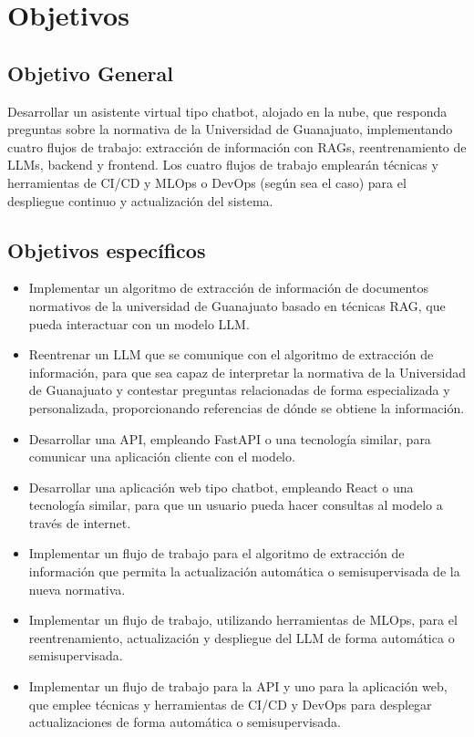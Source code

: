 \section{Objetivos}

\subsection{Objetivo General}

Desarrollar un asistente virtual tipo chatbot, alojado en la nube, que responda
preguntas sobre la normativa de la Universidad de Guanajuato, implementando cuatro
flujos de trabajo: extracción de información con RAGs, reentrenamiento de LLMs,
backend y frontend. Los cuatro flujos de trabajo emplearán técnicas y herramientas
de CI/CD y MLOps o DevOps (según sea el caso) para el despliegue continuo y
actualización del sistema.

\subsection{Objetivos específicos}

\begin{itemize}
      \item Implementar un algoritmo de extracción de información de documentos
            normativos de la universidad de Guanajuato basado en técnicas RAG, que
            pueda interactuar con un modelo LLM.
      \item Reentrenar un LLM que se comunique con el algoritmo de extracción de
            información, para que sea capaz de interpretar la normativa de la Universidad
            de Guanajuato y contestar preguntas relacionadas de forma especializada y
            personalizada, proporcionando referencias de dónde se obtiene la información.
      \item Desarrollar una API, empleando FastAPI o una tecnología similar,
            para comunicar una aplicación cliente con el modelo.
      \item Desarrollar una aplicación web tipo chatbot, empleando React o una
            tecnología similar, para que un usuario pueda hacer consultas al modelo a
            través de internet.
      \item Implementar un flujo de trabajo para el algoritmo de extracción de
            información que permita la actualización automática o semisupervisada de
            la nueva normativa.
      \item Implementar un flujo de trabajo, utilizando herramientas de MLOps,
            para el reentrenamiento, actualización y despliegue del LLM de forma automática
            o semisupervisada.
      \item Implementar un flujo de trabajo para la API y uno para la aplicación
            web, que emplee técnicas y herramientas de CI/CD y DevOps para desplegar
            actualizaciones de forma automática o semisupervisada.
\end{itemize}

